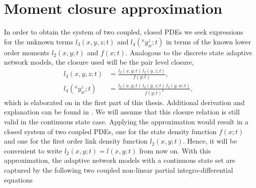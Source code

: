 \section{Moment closure approximation}
In order to obtain the system of two coupled, closed PDEs we seek expressions for the unknown terms $l_3(x,y,z;t)$ and $l_4(^x y^z_w;t)$ in terms of the known lower order moments $l_2(x,y;t)$ and $f(x;t)$. Analogous to the discrete state adaptive network models, the closure used will be the pair level closure, 
\begin{align}
l_3(x,y,z;t) & = \frac{l_2(x,y;t)\ l_2(y,z;t)}{f(y;t)},\\
l_4(^x y^z_w;t) &= \frac{l_2(x,y;t)\ l_2(y,z;t)\ l_2(y,w;t)}{f(y;t)^2},	
\end{align}
which is elaborated on in the first part of this thesis. Additional derivation and explanation can be found in \cite{Chen2016, Demirel2014, Newman2003}. We will assume that this closure relation is still valid in the continuous state case.
Applying the approximation would result in a closed system of two coupled PDEs, one for the state density function $f(x;t)$ and one for the first order link density function $l_2(x,y;t)$. Hence, it will be convenient to write  $l_2(x,y;t) =  l(x,y;t)$ from now on. With this approximation, the adaptive network models with a continuous state set are captured by the following two coupled non-linear partial integro-differential equations


